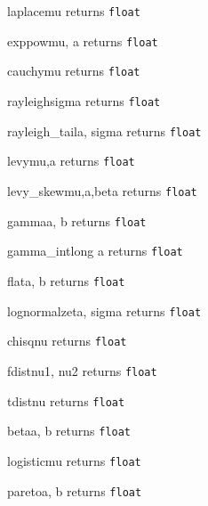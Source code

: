 \begin{methoddesc}{laplace}{mu}
\hfill returns {\tt float}
\end{methoddesc}
\begin{methoddesc}{exppow}{mu, a}
\hfill returns {\tt float}
\end{methoddesc}
\begin{methoddesc}{cauchy}{mu}
\hfill returns {\tt float}
\end{methoddesc}
\begin{methoddesc}{rayleigh}{sigma}
\hfill returns {\tt float}
\end{methoddesc}
\begin{methoddesc}{rayleigh\_tail}{a, sigma}
\hfill returns {\tt float}
\end{methoddesc}
\begin{methoddesc}{levy}{mu,a}
\hfill returns {\tt float}
\end{methoddesc}
\begin{methoddesc}{levy_skew}{mu,a,beta}
\hfill returns {\tt float}
\end{methoddesc}
\begin{methoddesc}{gamma}{a, b}
\hfill returns {\tt float}
\end{methoddesc}
\begin{methoddesc}{gamma\_int}{long a}
\hfill returns {\tt float}
\end{methoddesc}
\begin{methoddesc}{flat}{a, b}
\hfill returns {\tt float}
\end{methoddesc}
\begin{methoddesc}{lognormal}{zeta, sigma}
\hfill returns {\tt float}
\end{methoddesc}
\begin{methoddesc}{chisq}{nu}
\hfill returns {\tt float}
\end{methoddesc}
\begin{methoddesc}{fdist}{nu1, nu2}
\hfill returns {\tt float}
\end{methoddesc}
\begin{methoddesc}{tdist}{nu}
\hfill returns {\tt float}
\end{methoddesc}
\begin{methoddesc}{beta}{a, b}
\hfill returns {\tt float}
\end{methoddesc}
\begin{methoddesc}{logistic}{mu}
\hfill returns {\tt float}
\end{methoddesc}
\begin{methoddesc}{pareto}{a, b}
\hfill returns {\tt float}
\end{methoddesc}
